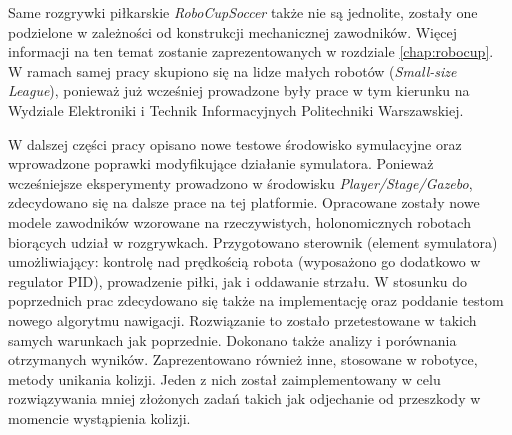 Same rozgrywki piłkarskie \emph{RoboCupSoccer} także nie są jednolite, zostały one podzielone w zależności od konstrukcji mechanicznej zawodników. Więcej informacji na ten temat zostanie zaprezentowanych w rozdziale
\ref{chap:robocup}. W ramach samej pracy skupiono się na lidze małych robotów (\emph{Small-size League}), ponieważ już wcześniej prowadzone były prace w tym kierunku na Wydziale Elektroniki i 
Technik Informacyjnych Politechniki Warszawskiej.

W dalszej części pracy opisano nowe testowe środowisko symulacyjne oraz wprowadzone poprawki modyfikujące działanie symulatora.
Ponieważ wcześniejsze eksperymenty prowadzono w środowisku \emph{Player/Stage/Gazebo}, zdecydowano się na dalsze prace na tej platformie.
Opracowane zostały nowe modele zawodników wzorowane na rzeczywistych, holonomicznych robotach
biorących udział w rozgrywkach. Przygotowano sterownik (element symulatora) umożliwiający: kontrolę nad prędkością robota (wyposażono go dodatkowo w regulator PID), prowadzenie piłki, jak i oddawanie strzału.
 W stosunku do poprzednich prac zdecydowano się także na implementację oraz poddanie testom nowego algorytmu nawigacji.  Rozwiązanie to zostało przetestowane w takich samych warunkach 
jak poprzednie. Dokonano także analizy i porównania otrzymanych wyników. Zaprezentowano również inne, stosowane w robotyce, metody unikania kolizji. Jeden z nich został zaimplementowany w celu
rozwiązywania mniej złożonych zadań takich jak odjechanie od przeszkody w momencie wystąpienia kolizji.

